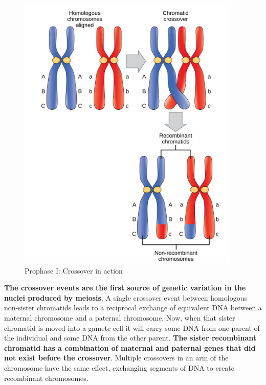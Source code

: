 \begin{enumerate}
\begin{figure}[h!]
    \centering
    \includegraphics[scale=0.4]{crossover-in-action.png}
    \caption{Prophase I: Crossover in action}
    \label{fig: crossover-in-action}
\end{figure}
        \textbf{The crossover events are the first source of genetic variation in the nuclei produced by meiosis}. A single crossover event between homologous non-sister chromatids leads to a reciprocal exchange of equivalent DNA between a maternal chromosome and a paternal chromosome. Now, when that sister chromatid is moved into a gamete cell it will carry some DNA from one parent of the individual and some DNA from the other parent. \textbf{The sister recombinant chromatid has a combination of maternal and paternal genes that did not exist before the crossover}. Multiple crossovers in an arm of the chromosome have the same effect, exchanging segments of DNA to create recombinant chromosomes.


\end{enumerate}
